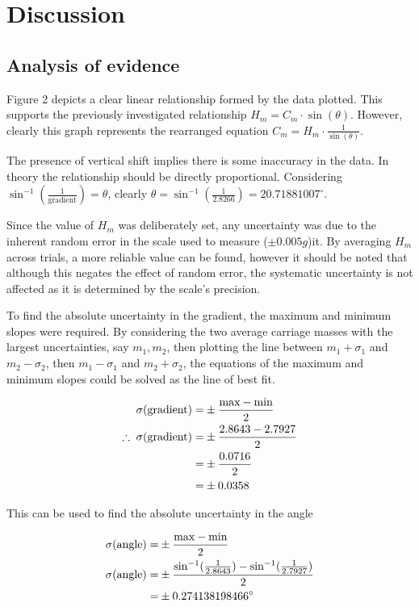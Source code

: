 \documentclass[11pt,a4paper]{article}
\begin{document}
\section{Discussion}
\subsection{Analysis of evidence}
Figure 2 depicts a clear linear relationship formed by the data plotted. This supports the previously investigated relationship  $H_m=C_m\cdot{\sin(\theta)}$. However, clearly this graph represents the rearranged equation $C_m=H_m\cdot \frac{1}{{\sin(\theta)}}$.

The presence of vertical shift implies there is some inaccuracy in the data. In theory the relationship should be directly proportional. Considering
 $\sin^{-1}\left(\frac{1}{\textrm{gradient}}\right)=\theta$, clearly $\theta = \sin^{-1}\left(\frac{1}{2.8266}\right)=20.71881007^\circ$.
 

Since the value of $H_m$ was deliberately set, any uncertainty was due to the inherent random error in the scale used to measure ($\pm0.005g$)it. By averaging $H_m$ across trials, a more reliable value can be found, however it should be noted that although this negates the effect of random error, the systematic uncertainty is not affected as it is determined by the scale's precision.

To find the absolute uncertainty in the gradient, the maximum and minimum slopes were required. By considering the two average carriage masses with the largest uncertainties, say $m_1, m_2$, then plotting the line between $m_1+\sigma_1$ and $m_2-\sigma_2$, then  $m_1-\sigma_1$ and $m_2+\sigma_2$, the equations of the maximum and minimum slopes could be solved as the line of best fit.


\begin{align*}
	\centering
	\sigma(\textrm{gradient})=&\pm\frac{\textrm{max}-\textrm{min}}{2}\\
	\therefore\;\sigma(\textrm{gradient})=&\pm\frac{2.8643-2.7927}{2}\\
	=&\pm\frac{0.0716}{2}\\
	=&\pm0.0358
\end{align*}

This can be used to find the absolute uncertainty in the angle

\begin{align*}
	\centering
	\sigma(\textrm{angle})=&\pm\frac{\textrm{max}-\textrm{min}}{2}\\
	\sigma(\textrm{angle})=&\pm\frac{\sin^{-1}(\frac{1}{2.8643})-\sin^{-1}(\frac{1}{2.7927})}{2}\\
	=&\pm0.274138198466^\circ 
	\end{align*}
\end{document}
